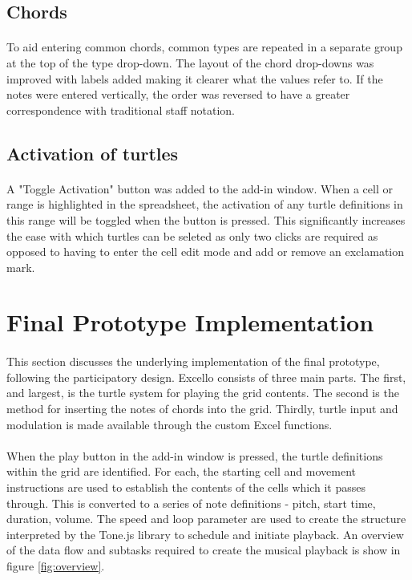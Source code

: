 \subsection{Chords}

\paragraph{} To aid entering common chords, common types are repeated in a separate group at the top of the type drop-down. The layout of the chord drop-downs was improved with labels added making it clearer what the values refer to. If the notes were entered vertically, the order was reversed to have a greater correspondence with traditional staff notation.

\subsection{Activation of turtles}

\paragraph{} A "Toggle Activation" button was added to the add-in window. When a cell or range is highlighted in the spreadsheet, the activation of any turtle definitions in this range will be toggled when the button is pressed.  This significantly increases the ease with which turtles can be seleted as only two clicks are required as opposed to having to enter the cell edit mode and add or remove an exclamation mark.

\section{Final Prototype Implementation}

\paragraph{} This section discusses the underlying implementation of the final prototype, following the participatory design. Excello consists of three main parts. The first, and largest, is the turtle system for playing the grid contents. The second is the method for inserting the notes of chords into the grid. Thirdly, turtle input and modulation is made available through the custom Excel functions.

\paragraph{} When the play button in the add-in window is pressed, the turtle definitions within the grid are identified. For each, the starting cell and movement instructions are used to establish the contents of the cells which it passes through. This is converted to a series of note definitions - pitch, start time, duration, volume. The speed and loop parameter are used to create the structure interpreted by the Tone.js library to schedule and initiate playback. An overview of the data flow and subtasks required to create the musical playback is show in figure \ref{fig:overview}.

